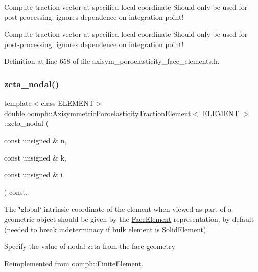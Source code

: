 Compute traction vector at specified local coordinate Should only be used for post-\/processing; ignores dependence on integration point! 

Compute traction vector at specified local coordinate Should only be used for post-\/processing; ignores dependence on integration point! 

Definition at line 658 of file axisym\+\_\+poroelasticity\+\_\+face\+\_\+elements.\+h.

\mbox{\label{classoomph_1_1AxisymmetricPoroelasticityTractionElement_a8c215f2c9d8b8e66513397b102b1e4aa}} 
\subsubsection{\texorpdfstring{zeta\+\_\+nodal()}{zeta\_nodal()}}
{\footnotesize\ttfamily template$<$class E\+L\+E\+M\+E\+NT$>$ \\
double \hyperlink{classoomph_1_1AxisymmetricPoroelasticityTractionElement}{oomph\+::\+Axisymmetric\+Poroelasticity\+Traction\+Element}$<$ E\+L\+E\+M\+E\+NT $>$\+::zeta\+\_\+nodal (\begin{DoxyParamCaption}\item[{const unsigned \&}]{n,  }\item[{const unsigned \&}]{k,  }\item[{const unsigned \&}]{i }\end{DoxyParamCaption}) const\hspace{0.3cm}{\ttfamily [inline]}, {\ttfamily [virtual]}}



The \char`\"{}global\char`\"{} intrinsic coordinate of the element when viewed as part of a geometric object should be given by the \hyperlink{classoomph_1_1FaceElement}{Face\+Element} representation, by default (needed to break indeterminacy if bulk element is Solid\+Element) 

Specify the value of nodal zeta from the face geometry 

Reimplemented from \hyperlink{classoomph_1_1FiniteElement_a849561c5fbcbc07dc49d2dc6cca68559}{oomph\+::\+Finite\+Element}.



